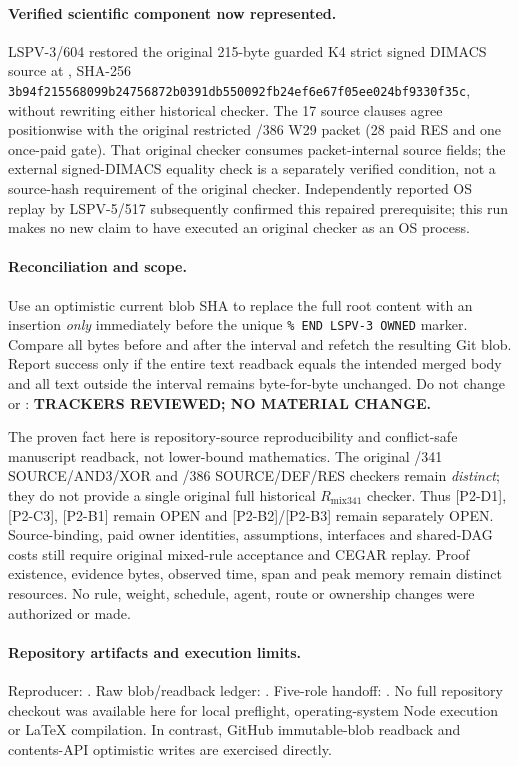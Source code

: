 \documentclass[11pt]{article}
\begin{document}
\paragraph{Verified scientific component now represented.}
LSPV-3/604 restored the original 215-byte guarded K4 strict signed DIMACS source at , SHA-256 \texttt{3b94f215568099b24756872b0391db550092fb24ef6e67f05ee024bf9330f35c}, without rewriting either historical checker. The 17 source clauses agree positionwise with the original restricted /386 W29 packet (28 paid RES and one once-paid gate). That original checker consumes packet-internal source fields; the external signed-DIMACS equality check is a separately verified condition, not a source-hash requirement of the original checker. Independently reported OS replay by LSPV-5/517 subsequently confirmed this repaired prerequisite; this run makes no new claim to have executed an original checker as an OS process.

\paragraph{Reconciliation and scope.}
Use an optimistic current blob SHA to replace the full root  content with an insertion \emph{only} immediately before the unique \texttt{\% END LSPV-3 OWNED} marker. Compare all bytes before and after the interval and refetch the resulting Git blob. Report success only if the entire text readback equals the intended merged body and all text outside the interval remains byte-for-byte unchanged. Do not change  or : \textbf{TRACKERS REVIEWED; NO MATERIAL CHANGE.}

The proven fact here is repository-source reproducibility and conflict-safe manuscript readback, not lower-bound mathematics. The original /341 SOURCE/AND3/XOR and /386 SOURCE/DEF/RES checkers remain \emph{distinct}; they do not provide a single original full historical \(R_{\mathrm{mix341}}\) checker. Thus [P2-D1], [P2-C3], [P2-B1] remain OPEN and [P2-B2]/[P2-B3] remain separately OPEN. Source-binding, paid owner identities, assumptions, interfaces and shared-DAG costs still require original mixed-rule acceptance and CEGAR replay. Proof existence, evidence bytes, observed time, span and peak memory remain distinct resources. No rule, weight, schedule, agent, route or ownership changes were authorized or made.

\paragraph{Repository artifacts and execution limits.}
Reproducer: . Raw blob/readback ledger: . Five-role handoff: . No full repository checkout was available here for local preflight, operating-system Node execution or LaTeX compilation. In contrast, GitHub immutable-blob readback and contents-API optimistic writes are exercised directly.
\end{document}
